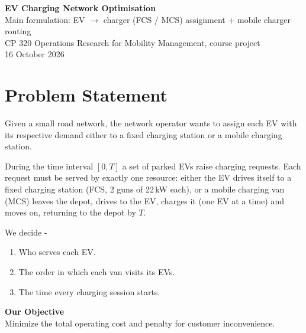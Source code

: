 \documentclass[12pt,a4paper]{article}
\begin{document}
\begin{center}
{\LARGE\bfseries\color{headblue} EV Charging Network Optimisation}\\[6pt]
{\large Main formulation: EV $\rightarrow$ charger (FCS / MCS) assignment + mobile charger routing}\\[4pt]
{\normalsize CP 320 Operations Research for Mobility Management, course project}\\[2pt]
{\normalsize 16 October 2026}
\end{center}
\vspace{4pt}

\section{Problem Statement}

Given a small road network, the network operator wants to assign each EV with its respective demand either to a fixed charging station or a mobile charging station.

\hspace{1.5em}During the time interval $[0,T]$ a set of parked EVs raise charging requests. Each request must be served by exactly one resource: either the EV drives itself to a fixed charging station (FCS, 2 guns of 22\,kW each), or a mobile charging van (MCS) leaves the depot, drives to the EV, charges it (one EV at a time) and moves on, returning to the depot by $T$.

We decide -
\begin{enumerate}[itemsep=2pt]
  \item Who serves each EV.
  \item The order in which each van visits its EVs.
  \item The time every charging session starts.
\end{enumerate}

\begin{objbox}
{\color{headblue}\textbf{Our Objective}}\\
Minimize the total operating cost and penalty for customer inconvenience.
\end{objbox}

\end{document}
